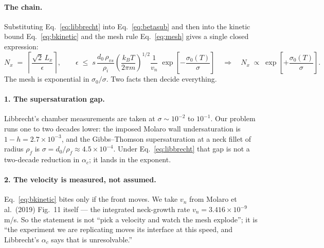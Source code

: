 %

\paragraph{The chain.}
Substituting Eq.~\eqref{eq:libbrecht} into Eq.~\eqref{eq:betasub} and then
into the kinetic bound Eq.~\eqref{eq:bkinetic} and the mesh rule
Eq.~\eqref{eq:mesh} gives a single closed expression:
%
\begin{equation}
  N_x
  \;=\;
  \left\lceil
    \frac{\sqrt{2}\,L_x}{\epsilon}
  \right\rceil,
  \qquad
  \epsilon \;\le\; s\,\frac{d_0\,\rho_{vs}}{\rho_i}
     \left(\frac{k_B T}{2\pi m}\right)^{1/2}
     \frac{1}{v_n}\;
     \exp\!\left[-\frac{\sigma_0(T)}{\sigma}\right]
  \quad\Longrightarrow\quad
  N_x \;\propto\; \exp\!\left[+\frac{\sigma_0(T)}{\sigma}\right].
  \label{eq:chain}
\end{equation}
%
The mesh is exponential in $\sigma_0/\sigma$. Two facts then decide
everything.

\paragraph{1. The supersaturation gap.}
Libbrecht's chamber measurements are taken at
$\sigma \sim 10^{-2}$ to $10^{-1}$. Our problem runs one to two decades
lower: the imposed Molaro wall undersaturation is $1-h = 2.7\times10^{-3}$,
and the Gibbs--Thomson supersaturation at a neck fillet of radius
$\rho_{f}$ is $\sigma = d_0/\rho_{f} \approx 4.5\times10^{-4}$. Under
Eq.~\eqref{eq:libbrecht} that gap is not a two-decade reduction in
$\alpha_c$; it lands in the exponent.

\paragraph{2. The velocity is measured, not assumed.}
Eq.~\eqref{eq:bkinetic} bites only if the front moves. We take $v_n$ from
Molaro et al.\ (2019) Fig.~11 itself --- the integrated neck-growth rate
$v_n = 3.416\times10^{-9}$ m/s. So the statement is not ``pick a velocity
and watch the mesh explode''; it is ``the experiment we are replicating
moves its interface at this speed, and Libbrecht's $\alpha_c$ says that is
unresolvable.''

